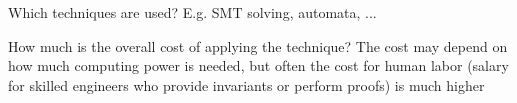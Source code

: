 \documentclass[a4paper]{article}
\begin{document}
\begin{minipage}[t]{0.16\linewidth}
\begin{betterlist}
\begin{betterlist}
			\item Which techniques are used? E.g. SMT solving, automata, ...

			\item How much is the overall cost of applying the technique? The cost may depend on how much computing power is needed, but often the cost for human labor (salary for skilled engineers who provide invariants or perform proofs) is much higher
		\end{betterlist}
	\end{betterlist}
\end{minipage}

\newpage
\end{document}
